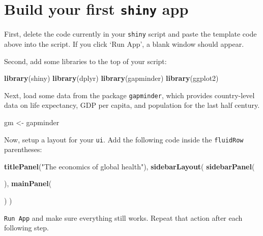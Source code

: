 \documentclass[]{book}
\newenvironment{Shaded}{\begin{snugshade}}{\end{snugshade}}
\newcommand{\KeywordTok}[1]{\textcolor[rgb]{0.13,0.29,0.53}{\textbf{#1}}}
\newcommand{\NormalTok}[1]{#1}
\newcommand{\StringTok}[1]{\textcolor[rgb]{0.31,0.60,0.02}{#1}}
\begin{document}
\hypertarget{build-your-first-shiny-app}{%
\section*{\texorpdfstring{Build your first \texttt{shiny} app}{Build your first shiny app}}\label{build-your-first-shiny-app}}

First, delete the code currently in your \texttt{shiny} script and paste the template code above into the script. If you click `Run App', a blank window should appear.

Second, add some libraries to the top of your script:

\begin{Shaded}
\begin{Highlighting}[]
\KeywordTok{library}\NormalTok{(shiny)}
\KeywordTok{library}\NormalTok{(dplyr)}
\KeywordTok{library}\NormalTok{(gapminder)}
\KeywordTok{library}\NormalTok{(ggplot2)}
\end{Highlighting}
\end{Shaded}

Next, load some data from the package \texttt{gapminder}, which provides country-level data on life expectancy, GDP per capita, and population for the last half century.

\begin{Shaded}
\begin{Highlighting}[]
\NormalTok{gm <-}\StringTok{ }\NormalTok{gapminder}
\end{Highlighting}
\end{Shaded}

Now, setup a layout for your \texttt{ui}. Add the following code inside the \texttt{fluidRow} parentheses:

\begin{Shaded}
\begin{Highlighting}[]
    \KeywordTok{titlePanel}\NormalTok{(}\StringTok{"The economics of global health"}\NormalTok{),}
    \KeywordTok{sidebarLayout}\NormalTok{(}
        \KeywordTok{sidebarPanel}\NormalTok{(}
            
\NormalTok{        ),}
        \KeywordTok{mainPanel}\NormalTok{(}
            
\NormalTok{        )}
\NormalTok{    )}
\end{Highlighting}
\end{Shaded}

\texttt{Run\ App} and make sure everything still works. Repeat that action after each following step.
\end{document}
